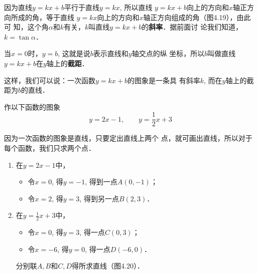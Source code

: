 因为直线$y=kx+b$平行于直线$y=kx$, 所以直线
$y=kx+b$向上的方向和$x$轴正方向所成的角，等于直线
$y=kx$向上的方向和$x$轴正方向组成的角（图4.19），由此可
知，这个角$\alpha$和$k$有关，$k$叫直线$y=kx+b$的\textbf{斜率}．据前面讨
论我们知道，$k=\tan \alpha$．

当$x=0$时，$y=b$, 这就是说$b$表示直线和$y$轴交点的纵
坐标，所以$b$叫做直线$y=kx+b$在$y$轴上的\textbf{截距}．

这样，我们可以说：一次函数$y=kx+b$的图象是一条具
有斜率$k$, 而在$y$轴上的截距为$b$的直线．

\begin{example}
作以下函数的图象
\[y=2x-1,\qquad y=\dfrac{1}{2}x+3\]
\end{example}

\begin{solution}
因为一次函数的图象是直线，只要定出直线上两个
点，就可画出直线，所以对于每个函数，我们只求两个点．
\begin{enumerate}
    \item 在$y=2x-1$中，
    \begin{itemize}
        \item 令$x=0$, 得$y=-1$, 得到一点$A(0,-1)$；
        \item 令$x=2$, 得$y=3$, 得到另一点$B(2,3)$．
    \end{itemize}
    \item 在$y=\frac{1}{2}x+3$中，
\begin{itemize}
    \item 令$x=0$, 得$y=3$, 得一点$C(0,3)$；
    \item 令$x=-6$, 得$y=0$, 得一点$D(-6,0)$．
\end{itemize}
分别联$A,B$和$C,D$得所求直线（图4.20）．
\end{enumerate}

\begin{figure}[htp]
    \centering
{}    
    \caption{}
\end{figure}
\end{solution}

